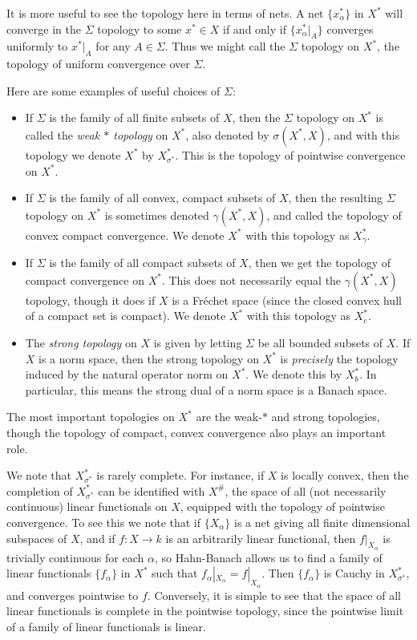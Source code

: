 It is more useful to see the topology here in terms of nets. A net $\{ x_\alpha^* \}$ in $X^*$ will converge in the $\Sigma$ topology to some $x^* \in X$ if and only if $\{ x_\alpha^*|_A \}$ converges uniformly to $x^*|_A$ for any $A \in \Sigma$. Thus we might call the $\Sigma$ topology on $X^*$, the topology of uniform convergence over $\Sigma$.

Here are some examples of useful choices of $\Sigma$:
%
\begin{itemize}
    \item If $\Sigma$ is the family of all finite subsets of $X$, then the $\Sigma$ topology on $X^*$ is called the \emph{weak $*$ topology} on $X^*$, also denoted by $\sigma(X^*,X)$, and with this topology we denote $X^*$ by $X^*_{\sigma^*}$. This is the topology of pointwise convergence on $X^*$.

    \item If $\Sigma$ is the family of all convex, compact subsets of $X$, then the resulting $\Sigma$ topology on $X^*$ is sometimes denoted $\gamma(X^*,X)$, and called the topology of convex compact convergence. We denote $X^*$ with this topology as $X^*_\gamma$.

    \item If $\Sigma$ is the family of all compact subsets of $X$, then we get the topology of compact convergence on $X^*$. This does not necessarily equal the $\gamma(X^*,X)$ topology, though it does if $X$ is a Fr\'{e}chet space (since the closed convex hull of a compact set is compact). We denote $X^*$ with this topology as $X^*_c$.

    \item The \emph{strong topology} on $X$ is given by letting $\Sigma$ be all bounded subsets of $X$. If $X$ is a norm space, then the strong topology on $X^*$ is \emph{precisely} the topology induced by the natural operator norm on $X^*$. We denote this by $X^*_b$. In particular, this means the strong dual of a norm space is a Banach space.
\end{itemize}
%
The most important topologies on $X^*$ are the weak-$*$ and strong topologies, though the topology of compact, convex convergence also plays an important role.

We note that $X^*_{\sigma^*}$ is rarely complete. For instance, if $X$ is locally convex, then the completion of $X^*_{\sigma^*}$ can be identified with $X^\#$, the space of all (not necessarily continuous) linear functionals on $X$, equipped with the topology of pointwise convergence. To see this we note that if $\{ X_\alpha \}$ is a net giving all finite dimensional subspaces of $X$, and if $f: X \to k$ is an arbitrarily linear functional, then $f|_{X_\alpha}$ is trivially continuous for each $\alpha$, so Hahn-Banach allows us to find a family of linear functionals $\{ f_\alpha \}$ in $X^*$ such that $f_\alpha|_{X_\alpha} = f|_{X_\alpha}$. Then $\{ f_\alpha \}$ is Cauchy in $X^*_{\sigma^*}$, and converges pointwise to $f$. Conversely, it is simple to see that the space of all linear functionals is complete in the pointwise topology, since the pointwise limit of a family of linear functionals is linear.

